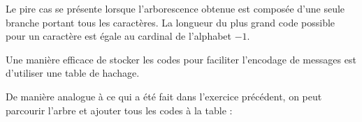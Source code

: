 
\Q
Le pire cas se présente lorsque l'arborescence obtenue est composée d'une seule branche portant tous les caractères. La longueur du plus grand code possible pour un caractère est égale au cardinal de l'alphabet $-1$.
\medskip

Une manière efficace de stocker les codes pour faciliter l'encodage de messages est d'utiliser une table de hachage.
\medskip

De manière analogue à ce qui a été fait dans l'exercice précédent, on peut parcourir l'arbre et ajouter tous les codes à la table :



\Fin

